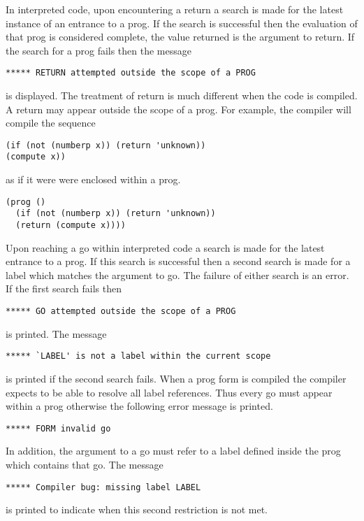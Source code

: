   In  interpreted  code,  upon encountering a return a search is
made for the latest instance of an entrance to a prog.   If  the
search  is  successful  then  the  evaluation  of  that  prog is
considered complete, the  value  returned  is  the  argument  to
return.  If the search for a prog fails then the message

\begin{verbatim}
***** RETURN attempted outside the scope of a PROG
\end{verbatim}
is  displayed.    The treatment of return is much different when
the code is compiled.  A return may appear outside the scope  of
a prog.  For example, the compiler will compile the sequence

\begin{verbatim}
(if (not (numberp x)) (return 'unknown))
(compute x))
\end{verbatim}
as if it were were enclosed within a prog.

\begin{verbatim}
(prog ()
  (if (not (numberp x)) (return 'unknown))
  (return (compute x))))
\end{verbatim}
  Upon  reaching  a  go within interpreted code a search is made
for the latest entrance to a prog.  If this search is successful
then a second search is made  for  a  label  which  matches  the
argument  to  go.  The failure of either search is an error.  If
the first search fails then

\begin{verbatim}
***** GO attempted outside the scope of a PROG
\end{verbatim}
is printed.  The message

\begin{verbatim}
***** `LABEL' is not a label within the current scope
\end{verbatim}
is printed if the second search fails.   When  a  prog  form  is
compiled  the  compiler  expects to be able to resolve all label
references.  Thus every go must appear within a  prog  otherwise
the following error message is printed.

\begin{verbatim}
***** FORM invalid go
\end{verbatim}
In  addition, the argument to a go must refer to a label defined
inside the prog which contains that go.  The message

\begin{verbatim}
***** Compiler bug: missing label LABEL
\end{verbatim}
is printed to indicate when this second restriction is not met.


